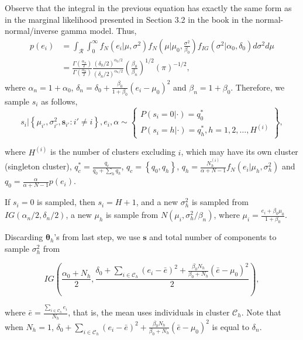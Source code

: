 \begin{enumerate}[leftmargin=*]
Observe that the integral in the previous equation has exactly the same form as in the marginal likelihood presented in Section 3.2 in the book in the normal-normal/inverse gamma model. Thus,
\begin{align*}
	p(e_i)&=\int_{\mathcal{R}}\int_{0}^{\infty}f_N(e_i|\mu,\sigma^2)f_N\left(\mu\Big|\mu_0,\frac{\sigma^2}{\beta_0}\right)f_{IG}(\sigma^2|\alpha_0,\delta_0)d\sigma^2 d\mu\\
	&=\frac{\Gamma\left(\frac{\alpha_n}{2}\right)}{\Gamma\left(\frac{\alpha_0}{2}\right)}\frac{(\delta_0/2)^{\alpha_0/2}}{(\delta_n/2)^{\alpha_n/2}}\left(\frac{\beta_0}{\beta_n}\right)^{1/2}(\pi)^{-1/2}, 
\end{align*}
where $\alpha_n=1+\alpha_0$, $\delta_n=\delta_0 + \frac{\beta_0}{1+\beta_0}(e_i-\mu_0)^2$ and $\beta_n = 1+\beta_0$.
Therefore, we sample $s_i$ as follows,
\begin{equation*}
	s_i|\left\{\mu_{i'},\sigma_{i'}^2,\boldsymbol s_{i'}:i'\neq i\right\}, e_i, \alpha\sim\begin{Bmatrix}P(s_i=0|\cdot)=q_0^*\\
		P(s_i=h|\cdot)=q_h^*, h=1,2,\dots,H^{(i)}\end{Bmatrix},
\end{equation*}

where $H^{(i)}$ is the number of clusters excluding $i$, which may have its own cluster (singleton cluster), $q^*_c=\frac{q_c}{q_0+\sum_h q_h}$, $q_c=\left\{q_0,q_h\right\}$, $q_h=\frac{N_h^{(i)}}{\alpha+N-1}f_N(e_i|\mu_h,\sigma_h^2)$ and $q_0=\frac{\alpha}{\alpha+N-1}p(e_i)$.

If $s_i=0$ is sampled, then $s_i=H+1$, and a new $\sigma_h^2$ is sampled from $IG\left(\alpha_n/2,\delta_n/2\right)$, a new $\mu_h$ is sample from $N(\mu_i,\sigma_h^2/\beta_n)$, where $\mu_i=\frac{e_i+\beta_0\mu_0}{1+\beta_0}$.

Discarding $\boldsymbol\theta_h$'s from last step, we use $\boldsymbol s$ and total number of components to sample $\sigma_h^2$ from 

\begin{equation*}
	IG\left(\frac{\alpha_0+N_h}{2},\frac{\delta_0+\sum_{i\in \mathcal{C}_h} (e_i-\bar{e})^2+\frac{\beta_0N_h}{\beta_0+N_h}(\bar{e}-\mu_0)^2}{2}\right),
\end{equation*}

where $\bar{e}=\frac{\sum_{i\in \mathcal{C}_h} e_i}{N_h}$, that is, the mean uses individuals in cluster $\mathcal{C}_h$. Note that when $N_h=1$, $\delta_0+\sum_{i\in \mathcal{C}_h} (e_i-\bar{e})^2+\frac{\beta_0N_h}{\beta_0+N_h}(\bar{e}-\mu_0)^2$ is equal to $\delta_n$. 


\end{enumerate}
